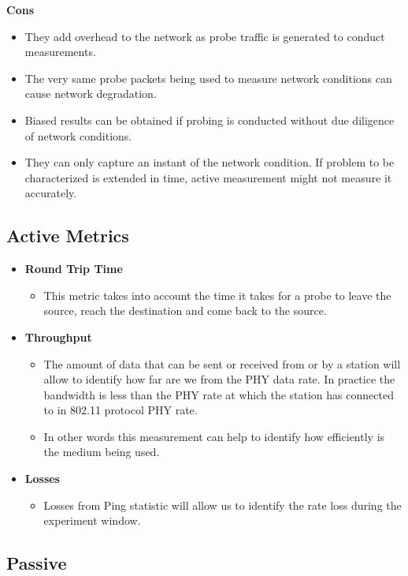 \textbf{Cons}
\begin{itemize}
	\item They add overhead to the network as probe traffic is generated to conduct measurements.
	\item The very same probe packets being used to measure network conditions can cause network degradation.
	\item Biased results can be obtained if probing is conducted without due diligence of network conditions.
	\item They can only capture an instant of the network condition. If problem to be characterized is extended in time, active measurement might not measure it accurately.
\end{itemize}

\subsection*{Active Metrics}

\begin{itemize}
	\item \textbf{Round Trip Time}
	\begin{itemize}
		\item This metric takes into account the time it takes for a probe to leave the source, reach the destination and come back to the source. 
	\end{itemize}
	
	\item \textbf{Throughput}
	\begin{itemize}
		\item The amount of data that can be sent or received from or by a station will allow to identify how far are we from the PHY data rate. In practice the bandwidth is less than the PHY rate at which the station has connected to in 802.11 protocol PHY rate.
		\item In other words this measurement can help to identify how efficiently is the medium being used.
	\end{itemize}
	\item \textbf{Losses}
	\begin{itemize}
		\item Losses from Ping statistic will allow us to identify the rate loss during the experiment window.
	\end{itemize}
\end{itemize}

\subsection*{Passive}

